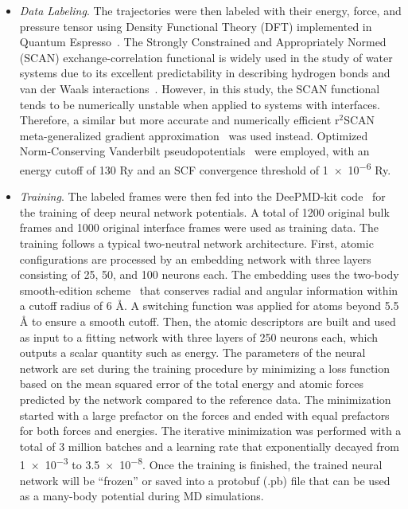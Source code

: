 \begin{itemize}
    \item \emph{Data Labeling}.
          The trajectories were then labeled with their energy, force, and pressure tensor using Density Functional Theory (DFT) implemented in Quantum Espresso~\cite{QE-2009,QE-2017,QE-2020}. The Strongly Constrained and Appropriately Normed (SCAN) exchange-correlation functional is widely used in the study of water systems due to its excellent predictability in describing hydrogen bonds and van der Waals interactions~\cite{sun2015strongly, chen2017ab}. However, in this study, the SCAN functional tends to be numerically unstable when applied to systems with interfaces. Therefore, a similar but more accurate and numerically efficient r$^2$SCAN meta-generalized gradient approximation~\cite{Furness2020} was used instead. Optimized Norm-Conserving Vanderbilt pseudopotentials~\cite{hamann2013optimized} were employed, with an energy cutoff of 130 Ry and an SCF convergence threshold of \num{1e-6} Ry.

    \item \emph{Training}.
          The labeled frames were then fed into the DeePMD-kit code~\cite{wang2018deepmd,zeng2023deepmd,lu2021,zhang2018end} for the training of deep neural network potentials. A total of 1200 original bulk frames and 1000 original interface frames were used as training data. The training follows a typical two-neutral network architecture. First, atomic configurations are processed by an embedding network with three layers consisting of 25, 50, and 100 neurons each. The embedding uses the two-body smooth-edition scheme~\cite{zhang2018end} that conserves radial and angular information within a cutoff radius of 6 \r{A}. A switching function was applied for atoms beyond 5.5 \r{A} to ensure a smooth cutoff. Then, the atomic descriptors are built and used as input to a fitting network with three layers of 250 neurons each, which outputs a scalar quantity such as energy. The parameters of the neural network are set during the training procedure by minimizing a loss function based on the mean squared error of the total energy and atomic forces predicted by the network compared to the reference data. The minimization started with a large prefactor on the forces and ended with equal prefactors for both forces and energies. The iterative minimization was performed with a total of 3 million batches and a learning rate that exponentially decayed from \num{1e-3} to \num{3.5e-8}. Once the training is finished, the trained neural network will be ``frozen'' or saved into a protobuf (.pb) file that can be used as a many-body potential during MD simulations.




\end{itemize}
